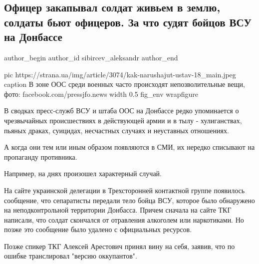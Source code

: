  
 
 
 
 
 
\subsection{Офицер закапывал солдат живьем в землю, солдаты бьют офицеров. За что судят бойцов ВСУ на Донбассе}
\label{sec:21_12_2020.news.ua.strana.sibircev_aleksandr.1.vsu_donbass_crimes}
\ifcmt
	author_begin
   author_id sibircev_aleksandr
	author_end
\fi

\ifcmt
  pic https://strana.ua/img/article/3074/kak-narushajut-ustav-18_main.jpeg
  caption В зоне ООС среди военных часто происходят непозволительные вещи, фото: facebook.com/pressjfo.news 
  width 0.5
  fig_env wrapfigure
\fi

В сводках пресс-служб ВСУ и штаба ООС на Донбассе редко упоминается о
чрезвычайных происшествиях в действующей армии и в тылу - хулиганствах, пьяных
драках, суицидах, несчастных случаях и неуставных отношениях.

А когда они тем или иным образом появляются в СМИ, их нередко списывают на
пропаганду противника.

Например, на днях произошел характерный случай.

На сайте украинской делегации в Трехсторонней контактной группе появилось
сообщение, что сепаратисты передали тело бойца ВСУ, которое было обнаружено на
неподконтрольной территории Донбасса. Причем сначала на сайте ТКГ написали, что
солдат скончался от отравления алкоголем или наркотиками. Но позже это
сообщение было удалено с официальных ресурсов.

Позже спикер ТКГ Алексей Арестович принял вину на себя, заявив, что по ошибке
транслировал "версию оккупантов". 

